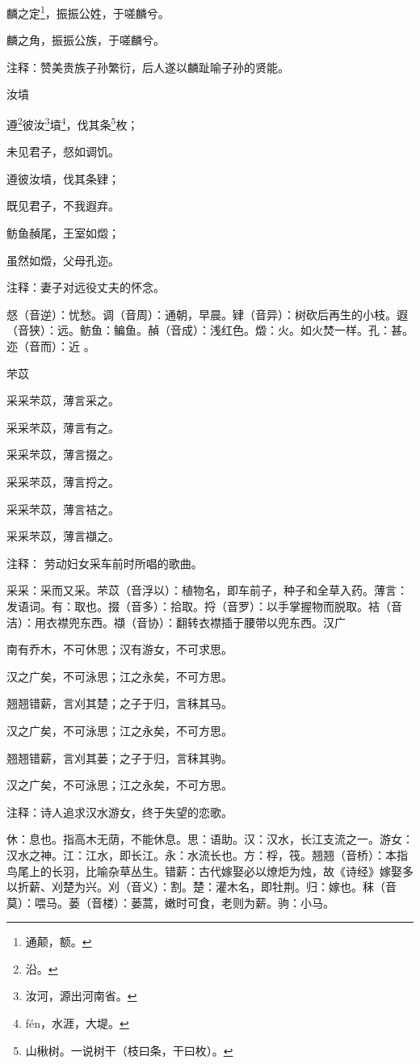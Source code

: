 \documentclass[12pt,UTF8]{ctexbook}
\begin{document}
麟之定\footnote{通颠，额。}，振振公姓，于嗟麟兮。

麟之角，振振公族，于嗟麟兮。

注释：赞美贵族子孙繁衍，后人遂以麟趾喻子孙的贤能。


汝墳

遵\footnote{沿。}彼汝\footnote{汝河，源出河南省。}墳\footnote{f\'en，水涯，大堤。}，伐其条\footnote{山楸树。一说树干（枝曰条，干曰枚）。}枚；

未见君子，惄如调饥。

遵彼汝墳，伐其条肄；

既见君子，不我遐弃。

鲂鱼赬尾，王室如燬；

虽然如燬，父母孔迩。

注释：妻子对远役丈夫的怀念。

惄（音逆）：忧愁。调（音周）：通朝，早晨。肄（音异）：树砍后再生的小枝。遐（音狭）：远。鲂鱼：鳊鱼。赬（音成）：浅红色。燬：火。如火焚一样。孔：甚。迩（音而）：近 。

芣苡

采采芣苡，薄言采之。

采采芣苡，薄言有之。

采采芣苡，薄言掇之。

采采芣苡，薄言捋之。

采采芣苡，薄言袺之。

采采芣苡，薄言襭之。

注释： 劳动妇女采车前时所唱的歌曲。

采采：采而又采。芣苡（音浮以）：植物名，即车前子，种子和全草入药。薄言：发语词。有：取也。掇（音多）：拾取。捋（音罗）：以手掌握物而脱取。袺（音洁）：用衣襟兜东西。襭（音协）：翻转衣襟插于腰带以兜东西。汉广

南有乔木，不可休思；汉有游女，不可求思。

汉之广矣，不可泳思；江之永矣，不可方思。

翘翘错薪，言刈其楚；之子于归，言秣其马。

汉之广矣，不可泳思；江之永矣，不可方思。

翘翘错薪，言刈其蒌；之子于归，言秣其驹。

汉之广矣，不可泳思；江之永矣，不可方思。

注释：诗人追求汉水游女，终于失望的恋歌。

休：息也。指高木无荫，不能休息。思：语助。汉：汉水，长江支流之一。游女：汉水之神。江：江水，即长江。永：水流长也。方：桴，筏。翘翘（音桥）：本指鸟尾上的长羽，比喻杂草丛生。错薪：古代嫁娶必以燎炬为烛，故《诗经》嫁娶多以折薪、刈楚为兴。刈（音义）：割。楚：灌木名，即牡荆。归：嫁也。秣（音莫）：喂马。蒌（音楼）：蒌蒿，嫩时可食，老则为薪。驹：小马。
\end{document}
